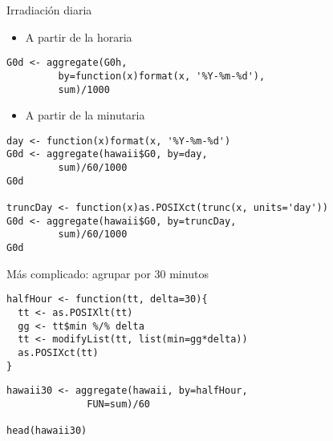 \documentclass[xcolor={usenames,svgnames,dvipsnames}]{beamer}
\begin{document}
\begin{frame}[fragile,label=sec-4-7]{Irradiación diaria}
 \begin{itemize}
\item A partir de la horaria
\end{itemize}
\lstset{language=R,numbers=none}
\begin{lstlisting}
G0d <- aggregate(G0h,
		 by=function(x)format(x, '%Y-%m-%d'),
		 sum)/1000
\end{lstlisting}
\begin{itemize}
\item A partir de la minutaria
\end{itemize}
\lstset{language=R,numbers=none}
\begin{lstlisting}
day <- function(x)format(x, '%Y-%m-%d')
G0d <- aggregate(hawaii$G0, by=day,
		 sum)/60/1000
G0d

truncDay <- function(x)as.POSIXct(trunc(x, units='day'))
G0d <- aggregate(hawaii$G0, by=truncDay,
		 sum)/60/1000
G0d
\end{lstlisting}
\end{frame}

\begin{frame}[fragile,label=sec-4-8]{Más complicado: agrupar por 30 minutos}
 \lstset{language=R,numbers=none}
\begin{lstlisting}
halfHour <- function(tt, delta=30){
  tt <- as.POSIXlt(tt)
  gg <- tt$min %/% delta
  tt <- modifyList(tt, list(min=gg*delta))
  as.POSIXct(tt)
}
\end{lstlisting}

\lstset{language=R,numbers=none}
\begin{lstlisting}
hawaii30 <- aggregate(hawaii, by=halfHour,
		      FUN=sum)/60

head(hawaii30)
\end{lstlisting}
\end{frame}
\end{document}
